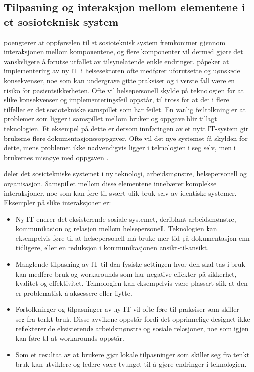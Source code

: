 \subsection{Tilpasning og interaksjon mellom elementene i et sosioteknisk system}
\label{sec:tilpasning}
\citet{Coiera04} poengterer at oppførselen til et sosioteknisk system fremkommer gjennom interaksjonen mellom komponentene, og flere komponenter vil dermed gjøre det vanskeligere å forutse utfallet av tilsynelatende enkle endringer. \citet{Harrison} påpeker at implementering av ny IT i helsesektoren ofte medfører uforutsette og uønskede konsekvenser, noe som kan undergrave gitte praksiser og i verste fall være en risiko for pasientsikkerheten. Ofte vil helsepersonell skylde på teknologien for at slike konsekvenser og implementeringsfeil oppstår, til tross for at det i flere tilfeller er det sosiotekniske samspillet som har feilet. En vanlig feiltolkning er at problemer som ligger i samspillet mellom bruker og oppgave blir tillagt teknologien. Et eksempel på dette er dersom innføringen av et nytt IT-system gir brukerne flere dokumentasjonssoppgaver. Ofte vil det nye systemet få skylden for dette, mens problemet ikke nødvendigvis ligger i teknologien i seg selv, men i brukernes misnøye med oppgaven \citep{FITT}.

\noindent
\citet{Harrison} deler det sosiotekniske systemet i ny teknologi, arbeidsmønstre, helsepersonell og organisasjon. Samspillet mellom disse elementene innebærer komplekse interaksjoner, noe som kan føre til svært ulik bruk selv av identiske systemer. Eksempler på slike interaksjoner er:

\begin{itemize}
\item Ny IT endrer det eksisterende sosiale systemet, deriblant arbeidsmønstre, kommunikasjon og relasjon mellom helsepersonell. Teknologien kan eksempelvis føre til at helsepersonell må bruke mer tid på dokumentasjon enn tidligere, eller en reduksjon i kommunikasjonen ansikt-til-ansikt.
\item Manglende tilpasning av IT til den fysiske settingen hvor den skal tas i bruk kan medføre bruk og workarounds som har negative effekter på sikkerhet, kvalitet og effektivitet. Teknologien kan eksempelvis være plassert slik at den er problematisk å aksessere eller flytte.
\item Fortolkninger og tilpasninger av ny IT vil ofte føre til praksiser som skiller seg fra tenkt bruk. Disse avvikene oppstår fordi det opprinnelige designet ikke reflekterer de eksisterende arbeidsmønstre og sosiale relasjoner, noe som igjen kan føre til at workarounds oppstår. 
\item Som et resultat av at brukere gjør lokale tilpasninger som skiller seg fra tenkt bruk kan utviklere og ledere være tvunget til å gjøre endringer i teknologien.
\end{itemize} 

